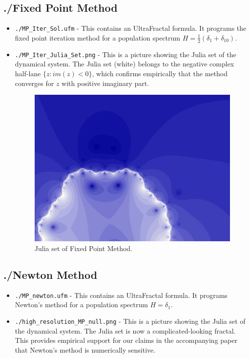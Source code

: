 \documentclass[english,11pt]{article} %
\begin{document}
\subsection{ ./Fixed Point Method}
\begin{itemize}
\item \verb+./MP_Iter_Sol.ufm+ - This contains an UltraFractal formula. It programs the fixed
point iteration method for a population spectrum $H = \frac{1}{2}(\delta_1 + \delta_{10})$.
\item \verb+./MP_Iter_Julia_Set.png+ - This is a picture showing the Julia set of the dynamical
system. The Julia set (white) belongs to the negative complex half-lane $\{z: im(z)<0\}$, which
confirms empirically that the method converges for $z$ with positive imaginary part.

\begin{figure}
\centering
  \includegraphics[scale=1]{"../Fixed Point Method/MP_Iter_Julia_Set"}
\caption{Julia set of Fixed Point Method.}
\label{fig1}
\end{figure}

\end{itemize}

\subsection{ ./Newton Method}
\begin{itemize}
\item \verb+./MP_newton.ufm+ - This contains an UltraFractal formula. It programs Newton's 
method for a population spectrum $H =\delta_1$.
\item \verb+./high_resolution_MP_null.png+ - This is a picture showing the Julia set of the dynamical
system. The Julia set is now a complicated-looking fractal. This provides empirical
support for our claims in the accompanying paper that Newton's method is numerically sensitive.
\end{itemize}
\end{document}
